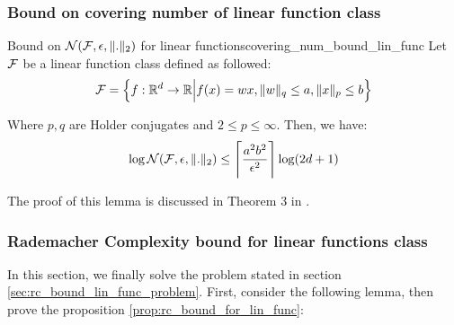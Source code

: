 \subsubsection{Bound on covering number of linear function class}
\begin{lemma}{Bound on $\mathcal{N}(\mathcal{F}, \epsilon, \|.\|_2)$ for linear functions}{covering_num_bound_lin_func}
    Let $\mathcal{F}$ be a linear function class defined as followed:
    \begin{align*}
        \mathcal{F} = \Big\{ 
            f:\mathbb{R}^d\to\mathbb{R} \Big| f(x) = wx, \|w\|_q \le a, \|x\|_p \le b
         \Big\}
    \end{align*}

    \noindent Where $p, q$ are Holder conjugates and $2\le p\le \infty$. Then, we have:
    \begin{align*}
        \log\mathcal{N}(\mathcal{F}, \epsilon, \|.\|_2) \le \Bigg\lceil \frac{a^2b^2}{\epsilon^2} \Bigg\rceil \log(2d+1)
    \end{align*}

    \noindent The proof of this lemma is discussed in Theorem 3 in \cite{article:tong_zhang}.
\end{lemma}

\begin{proof*}
    
\end{proof*}


\subsubsection{Rademacher Complexity bound for linear functions class}
In this section, we finally solve the problem stated in section \ref{sec:rc_bound_lin_func_problem}. First, consider the following lemma, then prove the proposition \ref{prop:rc_bound_for_lin_func}:

